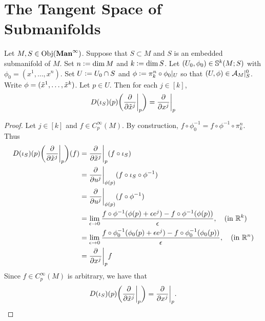 \documentclass{book}
\begin{document}
	
	
	
	\newpage
	\section{The Tangent Space of Submanifolds}
	
	\begin{ex} 
		Let $M, S \in \Obj(\Maninf)$. Suppose that $S \subset M$ and $S$ is an embedded submanifold of $M$. Set $n \defeq \dim M$ and $k \defeq \dim S$. Let $(U_0, \phi_0) \in \S^k(M;S)$ with $\phi_0 = (x^1, \ldots, x^n)$. Set $U \defeq U_0 \cap S$ and $\phi \defeq \pi^n_k \circ \phi_0|_U$ so that $(U, \phi) \in \MA_M|_S^0$. Write $\phi = (\tl{x}^1, \ldots, \tl{x}^k)$. Let $p \in U$. Then for each $j \in [k]$, 
		$$D(\iota_S)(p)\bigg(\frac{\p }{\p \tl{x}^j}\bigg|_p \bigg) = \frac{\p }{\p x^j} \bigg|_p$$
	\end{ex}

	\begin{proof}
		Let $j \in [k]$ and $f \in C^{\infty}_p(M)$. By construction, $f \circ \phi_0^{-1} = f \circ \phi^{-1} \circ \pi^n_k$. Thus
		\begin{align*}
			D(\iota_S)(p)\bigg(\frac{\p }{\p \tl{x}^j}\bigg|_p \bigg) (f)
			& = \frac{\p }{\p \tl{x}^j}\bigg|_p(f \circ \iota_S) \\
			& = \frac{\p }{\p u^j}\bigg|_{\phi(p)} (f \circ \iota_S \circ \phi^{-1} ) \\
			& = \frac{\p }{\p u^j}\bigg|_{\phi(p)} (f \circ \phi^{-1} ) \\
			& = \lim_{\ep \rightarrow 0} \frac{f \circ \phi^{-1}(\phi(p) + \ep e^j) - f \circ \phi^{-1}(\phi(p)) }{ \ep} , \quad \text{(in $\R^k$)} \\
			& = \lim_{\ep \rightarrow 0} \frac{f \circ \phi_0^{-1}(\phi_0(p) + \ep e^j) - f \circ \phi_0^{-1}(\phi_0(p)) }{ \ep} , \quad \text{(in $\R^n$)}  \\
			& = \frac{\p }{\p x ^j} \bigg|_p f
		\end{align*}
		Since $f \in C^{\infty}_p(M)$ is arbitrary, we have that 
		$$D(\iota_S)(p)\bigg(\frac{\p }{\p \tl{x}^j}\bigg|_p \bigg) = \frac{\p }{\p x ^j} \bigg|_p.$$
	\end{proof}
	
	
\end{document}
